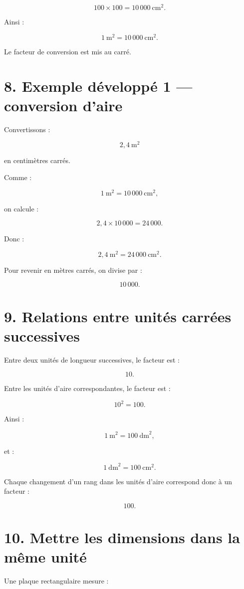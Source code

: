 \[
100\times100=10\,000\ \text{cm}^2.
\]

Ainsi :

\[
\boxed{1\ \text{m}^2=10\,000\ \text{cm}^2}.
\]

Le facteur de conversion est mis au carré.

\section{8. Exemple développé 1 — conversion d’aire}

Convertissons :

\[
2{,}4\ \text{m}^2
\]

en centimètres carrés.

Comme :

\[
1\ \text{m}^2=10\,000\ \text{cm}^2,
\]

on calcule :

\[
2{,}4\times10\,000=24\,000.
\]

Donc :

\[
\boxed{2{,}4\ \text{m}^2=24\,000\ \text{cm}^2}.
\]

Pour revenir en mètres carrés, on divise par :

\[
10\,000.
\]

\section{9. Relations entre unités carrées successives}

Entre deux unités de longueur successives, le facteur est :

\[
10.
\]

Entre les unités d’aire correspondantes, le facteur est :

\[
10^2=100.
\]

Ainsi :

\[
1\ \text{m}^2=100\ \text{dm}^2,
\]

et :

\[
1\ \text{dm}^2=100\ \text{cm}^2.
\]

Chaque changement d’un rang dans les unités d’aire correspond donc à un facteur :

\[
100.
\]

\section{10. Mettre les dimensions dans la même unité}

Une plaque rectangulaire mesure :

